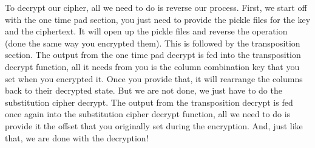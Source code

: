 \documentclass{article}
\begin{document}
\newline
To decrypt our cipher, all we need to do is reverse our process. First, we start off with the one time pad section, you just need to provide the pickle files for the key and the ciphertext. It will open up the pickle files and reverse the operation (done the same way you encrypted them). This is followed by the transposition section. The output from the one time pad decrypt is fed into the transposition decrypt function, all it needs from you is the column combination key that you set when you encrypted it. Once you provide that, it will rearrange the columns back to their decrypted state. But we are not done, we just have to do the substitution cipher decrypt. The output from the transposition decrypt is fed once again into the substitution cipher decrypt function, all we need to do is provide it the offset that you originally set during the encryption. And, just like that, we are done with the decryption!\newline

\end{document}
